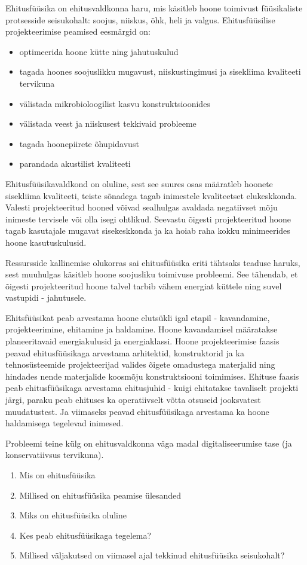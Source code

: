 Ehitusfüüsika on ehitusvaldkonna haru, mis käsitleb hoone toimivust füüsikaliste protsesside seisukohalt: soojus, niiskus, õhk, heli ja valgus. Ehitusfüüsilise projekteerimise peamised eesmärgid on:
\begin{itemize}
    \item optimeerida hoone kütte ning jahutuskulud
    \item tagada hoones soojuslikku mugavust, niiskustingimusi ja sisekliima kvaliteeti tervikuna
    \item välistada mikrobioloogilist kasvu konstruktsioonides
    \item välistada veest ja niiskusest tekkivaid probleeme
    \item tagada hoonepiirete õhupidavust
    \item parandada akustilist kvaliteeti
\end{itemize}
Ehitusfüüsikavaldkond on oluline, sest see suures osas määratleb hoonete sisekliima kvaliteeti, teiste sõnadega tagab inimestele kvaliteetset elukeskkonda. Valesti projekteeritud hooned võivad
sealhulgas avaldada negatiivset mõju inimeste tervisele või olla isegi ohtlikud. Seevastu õigesti projekteeritud hoone tagab kasutajale mugavat sisekeskkonda ja ka hoiab raha kokku 
minimeerides hoone kasutuskulusid.

Ressursside kallinemise olukorras sai ehitusfüüsika eriti tähtsaks teaduse haruks, sest muuhulgas käsitleb hoone soojusliku toimivuse probleemi. See tähendab, et õigesti projekteeritud hoone
talvel tarbib vähem energiat küttele ning suvel vastupidi - jahutusele.

Ehitsfüüsikat peab arvestama hoone elutsükli igal etapil - kavandamine, projekteerimine, ehitamine ja haldamine. Hoone kavandamisel määratakse planeeritavaid energiakulusid ja energiaklassi.
Hoone projekteerimise faasis peavad ehitusfüüsikaga arvestama arhitektid, konstruktorid ja ka tehnosüsteemide projekteerijad valides õigete omadustega materjalid ning hindades nende
materjalide koosmõju konstruktsiooni toimimises. Ehituse faasis peab ehitusfüüsikaga arvestama ehitusjuhid - kuigi ehitatakse tavaliselt projekti järgi, paraku peab ehituses ka operatiivselt
võtta otsuseid jooksvatest muudatustest. Ja viimaseks peavad ehitusfüüsikaga arvestama ka hoone haldamisega tegelevad inimesed. 

Probleemi teine külg on ehitusvaldkonna väga madal digitaliseerumise tase (ja konservatiivsus tervikuna).


\begin{enumerate}
    \item Mis on ehitusfüüsika
    \item Millised on ehitusfüüsika peamise ülesanded
    \item Miks on ehitusfüüsika oluline
    \item Kes peab ehitusfüüsikaga tegelema?
    \item Millised väljakutsed on viimasel ajal tekkinud ehitusfüüsika seisukohalt?
\end{enumerate}

